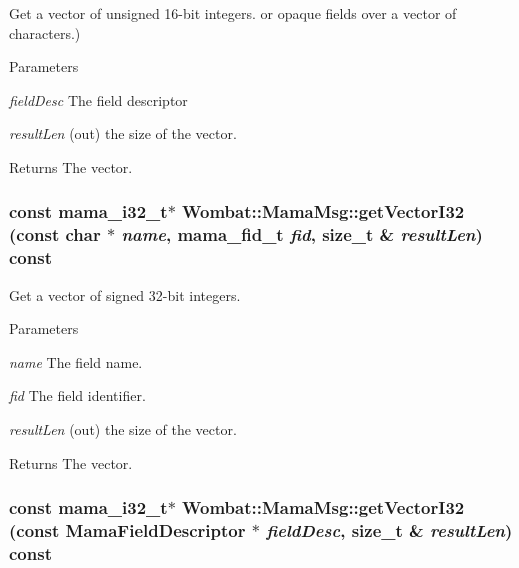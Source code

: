 Get a vector of unsigned 16-\/bit integers. or opaque fields over a vector of characters.) 
\begin{DoxyParams}{Parameters}
\item[{\em fieldDesc}]The field descriptor \item[{\em resultLen}](out) the size of the vector. \end{DoxyParams}
\begin{DoxyReturn}{Returns}
The vector. 
\end{DoxyReturn}
\hypertarget{classWombat_1_1MamaMsg_ae97d53b754809a3de1f707ccf2a67301}{
\subsubsection[{getVectorI32}]{\setlength{\rightskip}{0pt plus 5cm}const mama\_\-i32\_\-t$\ast$ Wombat::MamaMsg::getVectorI32 (const char $\ast$ {\em name}, \/  mama\_\-fid\_\-t {\em fid}, \/  size\_\-t \& {\em resultLen}) const}}
\label{classWombat_1_1MamaMsg_ae97d53b754809a3de1f707ccf2a67301}


Get a vector of signed 32-\/bit integers. 
\begin{DoxyParams}{Parameters}
\item[{\em name}]The field name. \item[{\em fid}]The field identifier. \item[{\em resultLen}](out) the size of the vector. \end{DoxyParams}
\begin{DoxyReturn}{Returns}
The vector. 
\end{DoxyReturn}
\hypertarget{classWombat_1_1MamaMsg_ae4f34c1a72aa213b65ab541a85e923f3}{
\subsubsection[{getVectorI32}]{\setlength{\rightskip}{0pt plus 5cm}const mama\_\-i32\_\-t$\ast$ Wombat::MamaMsg::getVectorI32 (const {\bf MamaFieldDescriptor} $\ast$ {\em fieldDesc}, \/  size\_\-t \& {\em resultLen}) const}}
\label{classWombat_1_1MamaMsg_ae4f34c1a72aa213b65ab541a85e923f3}


